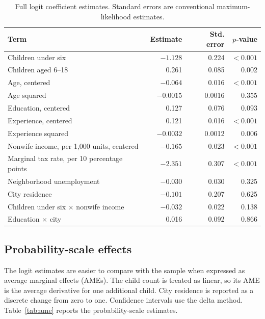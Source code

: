 \documentclass[conference]{IEEEtran}
\begin{document}
\begin{table}[!t]
\centering
\caption{Full logit coefficient estimates. Standard errors are conventional maximum-likelihood estimates.}
\label{tab:logit}
\small
\begin{tabular}{lrrr}
\toprule
Term & Estimate & Std. error & $p$-value \\
\midrule
Children under six & $-1.128$ & 0.224 & $<0.001$ \\
Children aged 6--18 & 0.261 & 0.085 & 0.002 \\
Age, centered & $-0.064$ & 0.016 & $<0.001$ \\
Age squared & $-0.0015$ & 0.0016 & 0.355 \\
Education, centered & 0.127 & 0.076 & 0.093 \\
Experience, centered & 0.121 & 0.016 & $<0.001$ \\
Experience squared & $-0.0032$ & 0.0012 & 0.006 \\
Nonwife income, per 1,000 units, centered & $-0.165$ & 0.023 & $<0.001$ \\
Marginal tax rate, per 10 percentage points & $-2.351$ & 0.307 & $<0.001$ \\
Neighborhood unemployment & $-0.030$ & 0.030 & 0.325 \\
City residence & $-0.101$ & 0.207 & 0.625 \\
Children under six $\times$ nonwife income & $-0.032$ & 0.022 & 0.138 \\
Education $\times$ city & 0.016 & 0.092 & 0.866 \\
\bottomrule
\end{tabular}
\end{table}

\subsection{Probability-scale effects}
The logit estimates are easier to compare with the sample when expressed as average marginal effects (AMEs). The child count is treated as linear, so its AME is the average derivative for one additional child. City residence is reported as a discrete change from zero to one. Confidence intervals use the delta method. Table~\ref{tab:ame} reports the probability-scale estimates.
\end{document}
